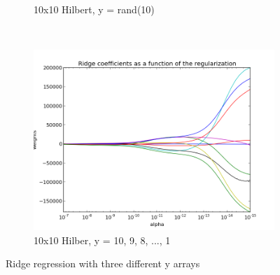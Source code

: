 \documentclass{article}
\begin{document}
\begin{figure}
\begin{subfigure}[b]{0.3\textwidth}
                    \caption{10x10 Hilbert, y = rand(10)}
                    \label{fig:yrand}
            \end{subfigure}
            ~ %
            \begin{subfigure}[b]{0.3\textwidth}
                    \centering
                    \includegraphics[width=\textwidth]{fig_y10to1.png}
                    \caption{10x10 Hilber, y = 10, 9, 8, ..., 1}
                    \label{fig:y10to1}
            \end{subfigure}
            \caption{Ridge regression with three different y arrays}\label{fig:images3}
    \end{figure}
\end{document}
